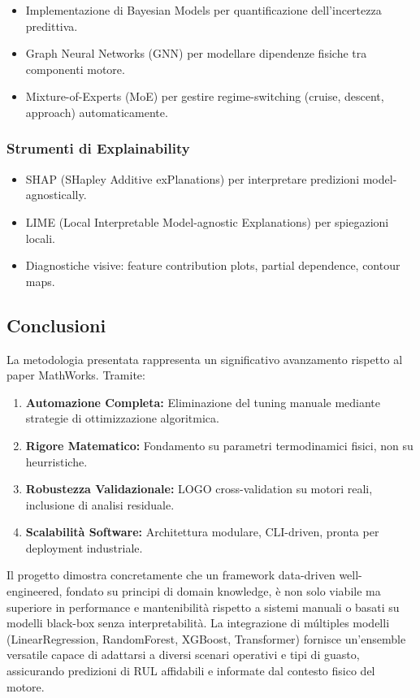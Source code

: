 \begin{itemize}
    \item Implementazione di Bayesian Models per quantificazione dell'incertezza predittiva.
    \item Graph Neural Networks (GNN) per modellare dipendenze fisiche tra componenti motore.
    \item Mixture-of-Experts (MoE) per gestire regime-switching (cruise, descent, approach) automaticamente.
\end{itemize}

\subsubsection{Strumenti di Explainability}

\begin{itemize}
    \item SHAP (SHapley Additive exPlanations) per interpretare predizioni model-agnostically.
    \item LIME (Local Interpretable Model-agnostic Explanations) per spiegazioni locali.
    \item Diagnostiche visive: feature contribution plots, partial dependence, contour maps.
\end{itemize}

\subsection{Conclusioni}

La metodologia presentata rappresenta un significativo avanzamento rispetto al paper MathWorks. Tramite:

\begin{enumerate}
    \item \textbf{Automazione Completa:} Eliminazione del tuning manuale mediante strategie di ottimizzazione algoritmica.
    \item \textbf{Rigore Matematico:} Fondamento su parametri termodinamici fisici, non su heurristiche.
    \item \textbf{Robustezza Validazionale:} LOGO cross-validation su motori reali, inclusione di analisi residuale.
    \item \textbf{Scalabilità Software:} Architettura modulare, CLI-driven, pronta per deployment industriale.
\end{enumerate}

Il progetto dimostra concretamente che un framework data-driven well-engineered, fondato su principi di domain knowledge, è non solo viabile ma superiore in performance e mantenibilità rispetto a sistemi manuali o basati su modelli black-box senza interpretabilità. La integrazione di múltiples modelli (LinearRegression, RandomForest, XGBoost, Transformer) fornisce un'ensemble versatile capace di adattarsi a diversi scenari operativi e tipi di guasto, assicurando predizioni di RUL affidabili e informate dal contesto fisico del motore.

